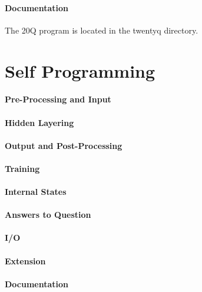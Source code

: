 \documentclass[12pt]{article}
\begin{document}
\paragraph*{Documentation}
The 20Q program is located in the twentyq directory.



\section{Self Programming}
\paragraph*{Pre-Processing and Input}

\paragraph*{Hidden Layering}

\paragraph*{Output and Post-Processing}

\paragraph*{Training}

\paragraph*{Internal States}

\paragraph*{Answers to Question}

\paragraph*{I/O}

\paragraph*{Extension}

\paragraph*{Documentation}

\end{document}
